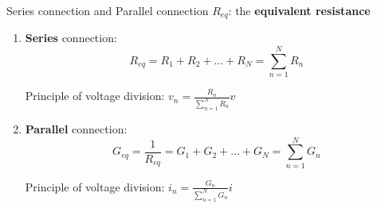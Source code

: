 \documentclass{beamer}
\begin{document}
     
     
    






\begin{frame}{Series connection and Parallel connection}
$R_{eq}$: the \textbf{equivalent resistance}


\begin{enumerate}
    \item \textbf{Series} connection:
    $$R_{eq}=R_1+R_2+…+R_N=\sum_{n=1}^{N}R_{n}$$

    Principle of voltage division: $v_n = \frac{R_n}{\sum_{n=1}^{N} R_n}v$
    
    \item \textbf{Parallel} connection:
    $$G_{eq}=\frac{1}{R_{eq}} = G_1+G_2+…+G_N=\sum_{n=1}^{N}G_{n}$$

    Principle of voltage division: $i_n = \frac{G_n}{\sum_{n=1}^{N} G_n}i$
\end{enumerate}


\end{frame}
\end{document}
